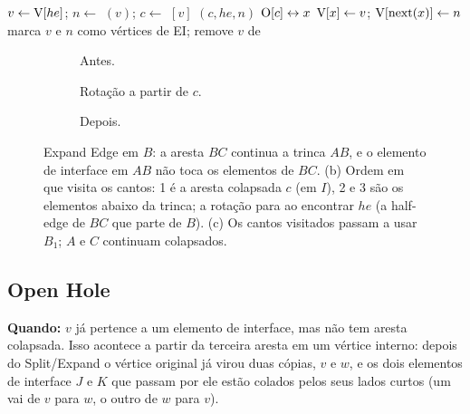 \begin{algorithm}[ht]
\caption{$(he, x)$}
\label{alg:expand}
\begin{algorithmic}[1]
\State $v\gets\mathrm{V}[he]$; \quad $n\gets$ $(v)$; \quad $c\gets$ $[v]$
\State {}$(c, he, n)$ 
\State $\mathrm{O}[c]\leftrightarrow x$
\State $\mathrm{V}[x]\gets v$; \quad $\mathrm{V}[\mathrm{next}(x)]\gets n$
\State marca $v$ e $n$ como vértices de EI; remove $v$ de 
\end{algorithmic}
\end{algorithm}

\begin{figure}[ht]
\centering
\begin{subfigure}[b]{0.32\linewidth}\centering\resizebox{\linewidth}{!}{}\caption{Antes.}\end{subfigure}\hfill
\begin{subfigure}[b]{0.32\linewidth}\centering\resizebox{\linewidth}{!}{}\caption{Rotação a partir de $c$.}\end{subfigure}\hfill
\begin{subfigure}[b]{0.32\linewidth}\centering\resizebox{\linewidth}{!}{}\caption{Depois.}\end{subfigure}
\caption{Expand Edge em $B$: a aresta $BC$ continua a trinca $AB$, e o elemento de interface em $AB$ não toca os
elementos de $BC$. (b) Ordem em que  visita os cantos: 1 é a aresta colapsada $c$ (em $I$),
2 e 3 são os elementos abaixo da trinca; a rotação para ao encontrar $he$ (a half-edge de $BC$ que parte de $B$). (c)
Os cantos visitados passam a usar $B_1$; $A$ e $C$ continuam colapsados.}
\label{fig:expand}
\end{figure}

\subsection{Open Hole}
\label{sec:hole}

\textbf{Quando:} $v$ já pertence a um elemento de interface, mas não tem aresta colapsada. Isso acontece a partir da
terceira aresta em um vértice interno: depois do Split/Expand o vértice original já virou duas cópias, $v$ e $w$, e os
dois elementos de interface $J$ e $K$ que passam por ele estão colados pelos seus lados curtos (um vai de $v$ para $w$, o
outro de $w$ para $v$).

